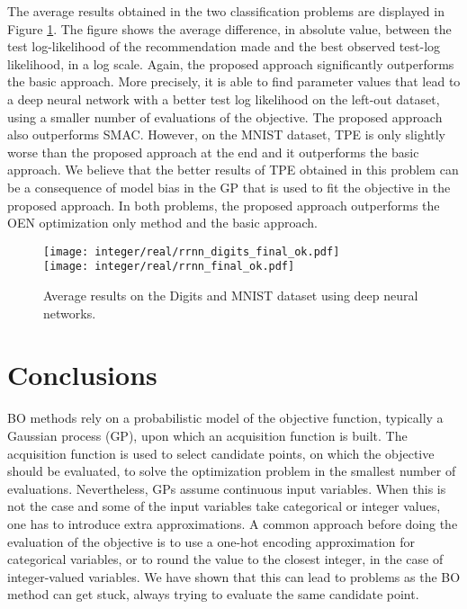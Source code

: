 The average results obtained in the two classification problems are displayed in Figure \ref{fig:results_deep}. 
The figure shows the average difference, in absolute value, between the test log-likelihood 
of the recommendation made and the best observed test-log likelihood, in a log scale. 
Again, the proposed approach significantly outperforms the basic approach. More precisely, it is able
to find parameter values that lead to a deep neural network with a better test log likelihood
on the left-out dataset, using a smaller number of evaluations of the objective. The proposed approach
also outperforms SMAC. However, on the MNIST dataset, TPE is only slightly worse than the proposed approach at 
the end and it outperforms the basic approach. We believe that the better results of TPE obtained in this 
problem can be a consequence of model bias in the GP that is used to fit the objective in the 
proposed approach. In both problems, the proposed approach outperforms the OEN optimization only method and the basic approach.

\begin{figure}[htb]
        \begin{center}
        \texttt{[image: integer/real/rrnn\_digits\_final\_ok.pdf]} \\
        \texttt{[image: integer/real/rrnn\_final\_ok.pdf]} \\
        \end{center}
\caption{{\small Average results on the Digits and MNIST dataset using deep neural networks.}}
\label{fig:results_deep}
\end{figure}

\section{Conclusions} \label{sec:conclusions}

BO methods rely on a probabilistic model of the objective function, typically a Gaussian process (GP), 
upon which an acquisition function is built. The acquisition function is used to select candidate
points, on which the objective should be evaluated, to solve the optimization problem
in the smallest number of evaluations. Nevertheless, GPs assume continuous input variables. 
When this is not the case and some of the input variables take categorical or integer values, 
one has to introduce extra approximations. 
A common approach before doing the evaluation of the objective is to use a one-hot encoding 
approximation for categorical variables, or to round the value to the closest integer, in the case 
of integer-valued variables. We have shown that this can lead to problems
as the BO method can get stuck, always trying to evaluate the same candidate point. 

